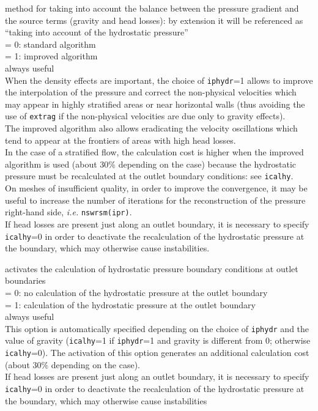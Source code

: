 {method for taking into account the balance between the pressure gradient and
the source terms (gravity and head losses): by extension it will be
referenced as ``taking into account of the hydrostatic pressure''\\
\hspace*{1.3cm}= 0: standard algorithm\\
\hspace*{1.3cm}= 1: improved algorithm\\
always useful\\
When the density effects are important, the choice of
{\tt iphydr}=1 allows to improve the interpolation of the pressure and correct the
non-physical velocities which may appear in highly
stratified areas or near horizontal walls (thus
avoiding the use of {\tt extrag} if the non-physical velocities are due only to
gravity effects).\\
The improved algorithm also allows eradicating the velocity oscillations
which tend to appear at the frontiers of areas with high head losses.\\
In the case of a stratified flow, the calculation cost is higher when the
improved algorithm is used (about 30\% depending on the case) because
the hydrostatic pressure must be recalculated at the outlet boundary
conditions: see {\tt icalhy}.\\
On meshes of insufficient quality, in order to
improve the convergence, it may be useful to increase the number of
iterations for the reconstruction of the pressure right-hand side,
{\em i.e.} \mbox{\tt nswrsm(ipr)}.\\
If head losses are present just along an outlet boundary, it is necessary to
specify {\tt icalhy}=0 in order to deactivate the recalculation of the hydrostatic
pressure at the boundary, which may otherwise cause instabilities.}

{activates the calculation of hydrostatic pressure boundary conditions at outlet
boundaries\\
\hspace*{1.3cm}= 0: no calculation of the hydrostatic pressure at the outlet boundary\\
\hspace*{1.3cm}= 1: calculation of the hydrostatic pressure at the outlet boundary\\
always useful\\
This option is automatically specified depending on the
choice of {\tt iphydr} and the value of gravity
({\tt icalhy}=1 if {\tt iphydr}=1 and gravity is different from 0; otherwise
{\tt icalhy}=0). The activation of this option generates an additional
calculation cost (about 30\% depending on the case).\\
If head losses are present just along an outlet boundary, it is necessary to
specify {\tt icalhy}=0 in order to deactivate the recalculation of the hydrostatic
pressure at the boundary, which may otherwise cause instabilities}

